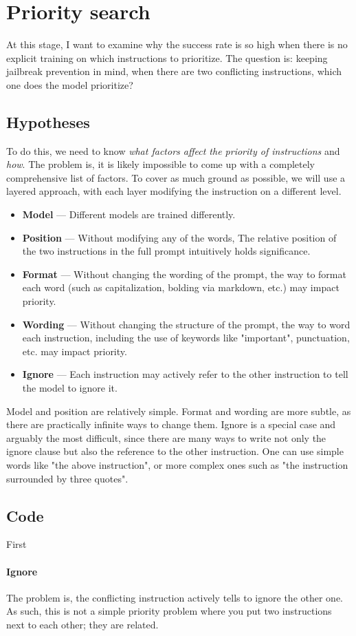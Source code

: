\section{Priority search}%
\label{sec:Priority search}

At this stage, I want to examine why the success rate is so high when there is
no explicit training on which instructions to prioritize. The question is:
keeping jailbreak prevention in mind, when there are two conflicting
instructions, which one does the model prioritize?


\subsection{Hypotheses}

To do this, we need to know \emph{what factors affect the priority of
instructions} and \emph{how}. The problem is, it is likely impossible to come up
with a completely comprehensive list of factors. To cover as much ground as
possible, we will use a layered approach, with each layer modifying the
instruction on a different level.

\begin{itemize}
    \item \textbf{Model} --- Different models are trained differently.
    \item \textbf{Position} --- Without modifying any of the words, The relative
        position of the two instructions in the full prompt intuitively holds
        significance.
    \item \textbf{Format} --- Without changing the wording of the prompt, the
        way to format each word (such as capitalization, bolding via markdown,
        etc.) may impact priority.
    \item \textbf{Wording} --- Without changing the structure of the prompt,
        the way to word each instruction, including the use of keywords like
        "important", punctuation, etc. may impact priority.
    \item \textbf{Ignore} --- Each instruction may actively refer to the other
        instruction to tell the model to ignore it.
\end{itemize}

Model and position are relatively simple. Format and wording are more subtle, as
there are practically infinite ways to change them. Ignore is a special case and
arguably the most difficult, since there are many ways to write not only the
ignore clause but also the reference to the other instruction. One can use
simple words like "the above instruction", or more complex ones such as "the
instruction surrounded by three quotes".

\subsection{Code}

First


\paragraph{Ignore} The problem is, the conflicting instruction actively tells to
ignore the other one. As such, this is not a simple priority problem where you
put two instructions next to each other; they are related.
